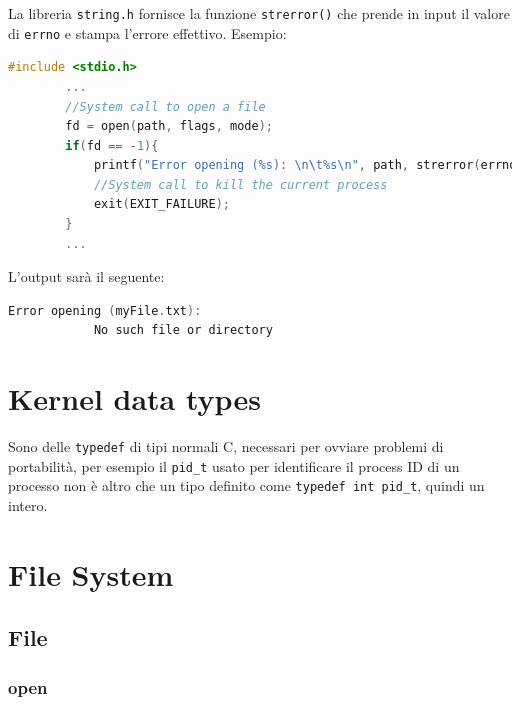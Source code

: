 \documentclass[a4paper, 12pt]{book}
\begin{document}
    La libreria \verb|string.h| fornisce la funzione 
    \verb|strerror()| che prende in input il valore di 
    \verb|errno| e stampa l'errore effettivo. Esempio:
    \begin{lstlisting}[language=C]
        #include <stdio.h>
        ... 
        //System call to open a file
        fd = open(path, flags, mode);
        if(fd == -1){
            printf("Error opening (%s): \n\t%s\n", path, strerror(errno));
            //System call to kill the current process
            exit(EXIT_FAILURE);
        }
        ...
    \end{lstlisting}
    L'output sarà il seguente:
    \begin{lstlisting}[language=C]
        Error opening (myFile.txt):
            No such file or directory        
    \end{lstlisting}

    \chapter{Kernel data types}

    Sono delle \verb|typedef| di tipi normali C, necessari
    per ovviare problemi di portabilità, per esempio 
    il \verb|pid_t| usato per identificare il process ID
    di un processo non è altro che un tipo definito come 
    \verb|typedef int pid_t|, quindi un intero.
    
    \chapter{File System}

    \section{File}

    \subsection{open}
\end{document}
